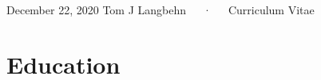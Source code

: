 \documentclass[11pt, a4paper]{awesome-cv}
\begin{document}
\makecvheader

\makecvfooter
  {December 22, 2020}
    {Tom J Langbehn~~~·~~~Curriculum Vitae}
  {\thepage}





\hypertarget{education}{%
\section{Education}\label{education}}
\end{document}
